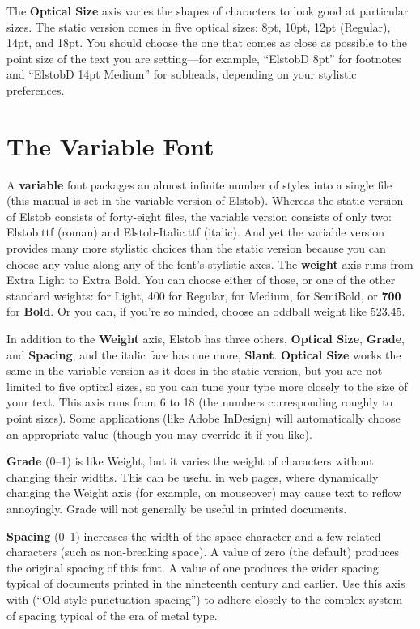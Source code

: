 \documentclass[12pt,letterpaper,openany]{book}
\begin{document}
The \textbf{Optical Size} axis varies the shapes of characters to look good at
particular sizes. The static version comes in five optical sizes: 8pt, 10pt,
12pt (Regular), 14pt, and 18pt. You should choose the one that comes as close
as possible to the point size of the text you are setting---for example, “ElstobD
8pt” for footnotes and “ElstobD 14pt Medium” for subheads, depending on your
stylistic preferences.

\section{The Variable Font}

A \textbf{variable} font packages an almost infinite number
of styles into a single file (this manual is set in the variable version of Elstob).
Whereas the static version of Elstob consists
of forty-eight files, the variable version consists of only two: Elstob.ttf
(roman) and Elstob-Italic.ttf (italic). And yet the variable version provides
many more stylistic choices than the static version because you can choose any
value along any of the font’s stylistic axes. The \textbf{weight} axis
runs from { Extra Light} to { Extra Bold}. You
can choose either of those, or one of the other standard weights: {} for
{\light Light}, 400 for Regular, {} for {\medium Medium},
{} for {\semibold SemiBold}, or \textbf{700} for \textbf{Bold}.
Or you can, if you’re so minded, choose {\oddball an oddball weight like
523.45}.

In addition to the \textbf{Weight} axis, Elstob has three others, \textbf{Optical
Size}, \textbf{Grade}, and \textbf{Spacing}, and the italic face has one more, \textbf{Slant}.
\textbf{Optical Size} works the same in the variable version as it does in the
static version, but you are not limited to five optical sizes, so you can tune
your type more closely to the size of your text. This axis runs from 6 to
18 (the numbers corresponding roughly to point sizes). Some applications (like
Adobe InDesign) will automatically
choose an appropriate value (though you may override it if you like).

\textbf{Grade}
(0--1) is like Weight, but it varies the weight of characters without changing
their widths. This can be useful in web pages, where dynamically changing the
Weight axis (for example, on mouseover) may cause text to reflow annoyingly. Grade will
not generally be useful in printed documents.

\textbf{Spacing} (0--1) increases the width of the space character and a few
related characters (such as non-breaking space). A value of zero (the default)
produces the original spacing of this font. A value of one produces the wider
spacing typical of documents printed in the nineteenth century and earlier.
Use this axis with  (“Old-style punctuation spacing”) to adhere closely to
the complex system of spacing typical of the era of metal type.
\end{document}
